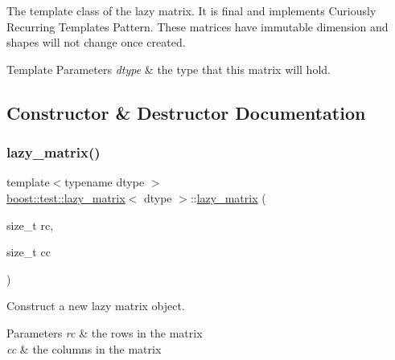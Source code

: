 The template class of the lazy matrix. It is final and implements Curiously Recurring Templates Pattern. These matrices have immutable dimension and shapes will not change once created. 


\begin{DoxyTemplParams}{Template Parameters}
{\em dtype} & the type that this matrix will hold. \\
\hline
\end{DoxyTemplParams}


\subsection{Constructor \& Destructor Documentation}
\mbox{\label{classboost_1_1test_1_1lazy__matrix_ad3a6c255f2b37a1a48a1780cd79e94db}} 
\subsubsection{\texorpdfstring{lazy\_matrix()}{lazy\_matrix()}\hspace{0.1cm}{\footnotesize\ttfamily [1/4]}}
{\footnotesize\ttfamily template$<$typename dtype $>$ \\
\mbox{\hyperlink{classboost_1_1test_1_1lazy__matrix}{boost\+::test\+::lazy\+\_\+matrix}}$<$ dtype $>$\+::\mbox{\hyperlink{classboost_1_1test_1_1lazy__matrix}{lazy\+\_\+matrix}} (\begin{DoxyParamCaption}\item[{size\+\_\+t}]{rc,  }\item[{size\+\_\+t}]{cc }\end{DoxyParamCaption})\hspace{0.3cm}{\ttfamily [inline]}}



Construct a new lazy matrix object. 


\begin{DoxyParams}{Parameters}
{\em rc} & the rows in the matrix \\
\hline
{\em cc} & the columns in the matrix \\
\hline
\end{DoxyParams}
\mbox{\label{classboost_1_1test_1_1lazy__matrix_aeef69d0d1de7f09a34ba3110224f9579}} 
